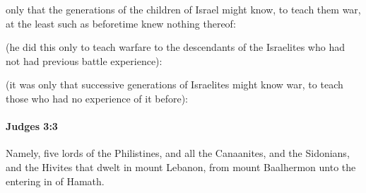 			\begin{versebox}
					\item[BHS] 
					\item[ASV] only that the generations of the children of Israel might know, to teach them war, at the least such as beforetime knew nothing thereof:
					\item[NIV] (he did this only to teach warfare to the descendants of the Israelites who had not had previous battle experience):
					\item[NRSV] (it was only that successive generations of Israelites might know war, to teach those who had no experience of it before):
			\end{versebox}

		\paragraph{Judges 3:3} %
			\label{JUDGES-3-3}

			Namely, five lords of the Philistines, and all the Canaanites, and the Sidonians, and the Hivites that dwelt in mount Lebanon, from mount Baalhermon unto the entering in of Hamath.

